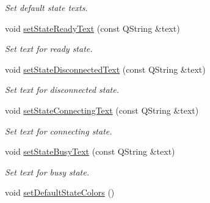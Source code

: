 \begin{DoxyCompactItemize}
\begin{DoxyCompactList}\small\item\em Set default state texts. \end{DoxyCompactList}\item 
\hypertarget{classmdt_device_status_widget_abaf710ee64a06fa9d3d640e785c38dd5}{
void \hyperlink{classmdt_device_status_widget_abaf710ee64a06fa9d3d640e785c38dd5}{setStateReadyText} (const QString \&text)}
\label{classmdt_device_status_widget_abaf710ee64a06fa9d3d640e785c38dd5}

\begin{DoxyCompactList}\small\item\em Set text for ready state. \end{DoxyCompactList}\item 
\hypertarget{classmdt_device_status_widget_a9c296a28b7de3cf9694a0630a64bee15}{
void \hyperlink{classmdt_device_status_widget_a9c296a28b7de3cf9694a0630a64bee15}{setStateDisconnectedText} (const QString \&text)}
\label{classmdt_device_status_widget_a9c296a28b7de3cf9694a0630a64bee15}

\begin{DoxyCompactList}\small\item\em Set text for disconnected state. \end{DoxyCompactList}\item 
\hypertarget{classmdt_device_status_widget_a446ab6546eaaa87f97adceb1ae551554}{
void \hyperlink{classmdt_device_status_widget_a446ab6546eaaa87f97adceb1ae551554}{setStateConnectingText} (const QString \&text)}
\label{classmdt_device_status_widget_a446ab6546eaaa87f97adceb1ae551554}

\begin{DoxyCompactList}\small\item\em Set text for connecting state. \end{DoxyCompactList}\item 
\hypertarget{classmdt_device_status_widget_aa4c289bdfe1f5a0062bc8f6a9dc58fff}{
void \hyperlink{classmdt_device_status_widget_aa4c289bdfe1f5a0062bc8f6a9dc58fff}{setStateBusyText} (const QString \&text)}
\label{classmdt_device_status_widget_aa4c289bdfe1f5a0062bc8f6a9dc58fff}

\begin{DoxyCompactList}\small\item\em Set text for busy state. \end{DoxyCompactList}\item 
\hypertarget{classmdt_device_status_widget_a4e3b964a75b11b9a5b938698cd719ac7}{
void \hyperlink{classmdt_device_status_widget_a4e3b964a75b11b9a5b938698cd719ac7}{setDefaultStateColors} ()}
\label{classmdt_device_status_widget_a4e3b964a75b11b9a5b938698cd719ac7}


\end{DoxyCompactItemize}

